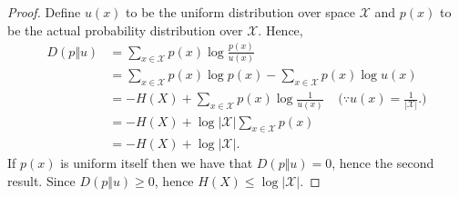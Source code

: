 \documentclass{article}
\theoremstyle{definition}
\theoremstyle{remark}
\theoremstyle{definition}
\theoremstyle{definition}
\theoremstyle{definition}
\DeclarePairedDelimiter\abs{\lvert}{\rvert}
\newcommand{\supp}[1]{\mathcal{#1}}
\newcommand{\KL}[2]{D\left ( #1 \Vert #2\right )}
\renewcommand{\abs}[1]{\left \vert #1\right \vert}
\begin{document}
\begin{proof}
	Define $ u(x) $ to be the uniform distribution over space $ \supp{X} $ and $ p(x) $ to be the actual probability distribution over $ \supp{X} $. Hence,
	\begin{equation*}
		\begin{split}
			\KL{p}{u} &= \sum_{x\in\supp{X}}p(x)\log\frac{p(x)}{u(x)} \\
			&= \sum_{x\in \supp{X}} p(x)\log p(x) - \sum_{x\in \supp{X}} p(x) \log u(x)\\
			&= -H(X) + \sum_{x\in \supp{X}} p(x) \log \frac{1}{u(x)}\;\;\;\;\text{($\because u(x) = \frac{1}{\abs{\supp{X}}}$}.)\\
			&= -H(X) + \log{\abs{\supp{X}}} \sum_{x\in \supp{X}} p(x)\\
			&= -H(X) + \log\abs{\supp{X}}.
		\end{split}
	\end{equation*}
If $ p(x) $ is uniform itself then we have that $ \KL{p}{u} = 0$, hence the second result. Since $ \KL{p}{u} \ge 0$, hence $ H(X) \le \log\abs{\supp{X}}$. 
\end{proof}
\hrulefill
\end{document}
